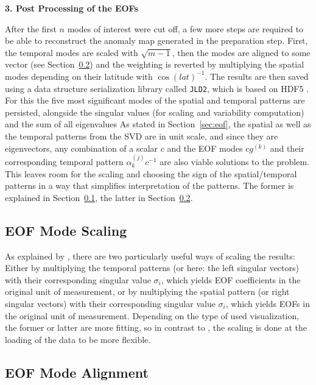 \textbf{3. Post Processing of the EOFs}

After the first $n$ modes of interest were cut off, a few more steps are required to be able to reconstruct the anomaly map generated in the preparation step.  
First, the temporal modes are scaled with $\sqrt{m-1}$, then the modes are aligned to some vector (see Section~\ref{sec:mode_alignment}) and the weighting is reverted by multiplying the spatial modes depending on their latitude with $\cos(lat)^{-1}$.
The results are then saved using a data structure serialization library called \texttt{JLD2}, which is based on HDF5 \cite{noauthor_juliaiojld2jl_2024}. 
For this the five most significant modes of the spatial and temporal patterns are persisted, alongside the singular values (for scaling and variability computation) and the sum of all eigenvalues
As stated in Section~\ref{sec:eof}, the spatial as well as the temporal patterns from the SVD are in unit scale, and since they are eigenvectors, any combination of a scalar $c$ and the EOF modes $cg^{(k)}$ and their corresponding temporal pattern $\alpha^{(j)}_k c^{-1}$ are also viable solutions to the problem. 
This leaves room for the scaling and choosing the sign of the spatial/temporal patterns in a way that simplifies interpretation of the patterns. 
The former is explained in Section~\ref{sec:mode_scaling}, the latter  in Section~\ref{sec:mode_alignment}.

\subsection{EOF Mode Scaling}
\label{sec:mode_scaling}

As explained by , there are two particularly useful ways of scaling the results: 
Either by multiplying the temporal patterns (or here: the left singular vectors) with their corresponding singular value $\sigma_i$, which yields EOF coefficients in the original unit of measurement, or by multiplying the spatial pattern (or right singular vectors) with their corresponding singular value $\sigma_i$, which yields EOFs in the original unit of measurement. 
Depending on the type of used visualization, the former or latter are more fitting, so in contrast to \cite{vietinghoffdiss}, the scaling is done at the loading of the data to be more flexible.

\subsection{EOF Mode Alignment}
\label{sec:mode_alignment}

